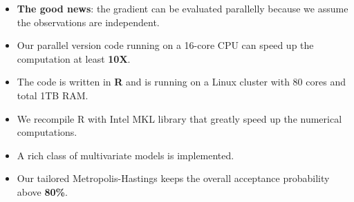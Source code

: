 \documentclass{beamer}
\begin{document}
\begin{frame}[allowframebreaks]
\begin{itemize}
\begin{itemize}
    \end{itemize}

  \item \textbf{The good news}: the gradient can be evaluated parallelly because we assume
    the observations are independent.

  \item Our parallel version code running on a 16-core CPU can speed up the
    computation at least \textbf{10X}.


  \item The code is written in \textbf{R} and is running on a Linux cluster with 80 cores
    and total 1TB RAM.

  \item We recompile R with Intel MKL library that greatly speed up the numerical
    computations.

  \item A rich class of multivariate models is implemented.

  \item Our tailored Metropolis-Hastings keeps the overall acceptance probability above
    \textbf{80\%}.
  \end{itemize}
\end{frame}

\end{document}
